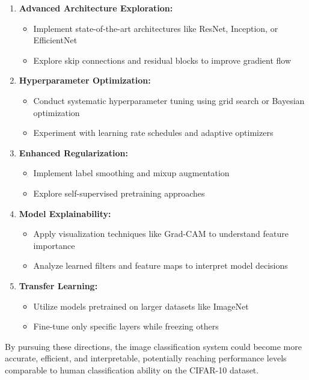 \documentclass[12pt]{article}
\begin{document}
\begin{enumerate}
    \item \textbf{Advanced Architecture Exploration:} 
    \begin{itemize}
        \item Implement state-of-the-art architectures like ResNet, Inception, or EfficientNet
        \item Explore skip connections and residual blocks to improve gradient flow
    \end{itemize}
    
    \item \textbf{Hyperparameter Optimization:}
    \begin{itemize}
        \item Conduct systematic hyperparameter tuning using grid search or Bayesian optimization
        \item Experiment with learning rate schedules and adaptive optimizers
    \end{itemize}
    
    \item \textbf{Enhanced Regularization:}
    \begin{itemize}
        \item Implement label smoothing and mixup augmentation
        \item Explore self-supervised pretraining approaches
    \end{itemize}
    
    \item \textbf{Model Explainability:}
    \begin{itemize}
        \item Apply visualization techniques like Grad-CAM to understand feature importance
        \item Analyze learned filters and feature maps to interpret model decisions
    \end{itemize}
    
    \item \textbf{Transfer Learning:}
    \begin{itemize}
        \item Utilize models pretrained on larger datasets like ImageNet
        \item Fine-tune only specific layers while freezing others
    \end{itemize}
\end{enumerate}

By pursuing these directions, the image classification system could become more accurate, efficient, and interpretable, potentially reaching performance levels comparable to human classification ability on the CIFAR-10 dataset.
\end{document}
